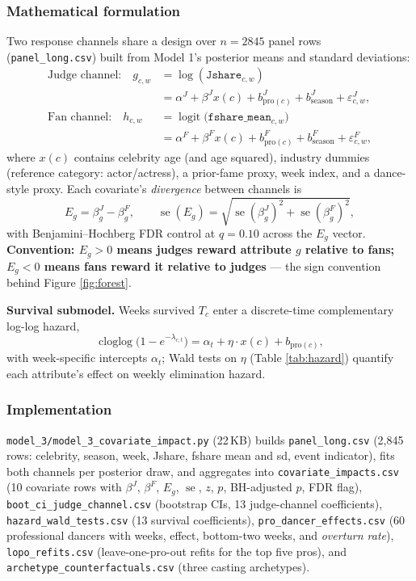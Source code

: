 \subsubsection{Mathematical formulation}

Two response channels share a design over $n = 2845$ panel rows
(\texttt{panel\_long.csv}) built from Model 1's posterior means and standard deviations:
\begin{align}
\text{Judge channel:}\quad g_{c,w} &= \log(\texttt{Jshare}_{c,w})\nonumber\\
 &= \alpha^J + \beta^J x(c) + b^J_{\text{pro}(c)} + b^J_{\text{season}} + \varepsilon^J_{c,w},\\
\text{Fan channel:}\quad h_{c,w} &= \operatorname{logit}\big(\texttt{fshare\_mean}_{c,w}\big)\nonumber\\
 &= \alpha^F + \beta^F x(c) + b^F_{\text{pro}(c)} + b^F_{\text{season}} + \varepsilon^F_{c,w},
\end{align}
where $x(c)$ contains celebrity age (and age squared), industry dummies (reference
category: actor/actress), a prior-fame proxy, week index, and a dance-style proxy.
Each covariate's \emph{divergence} between channels is
\begin{equation}
E_g = \beta^J_g - \beta^F_g, \qquad
\operatorname{se}(E_g) = \sqrt{\operatorname{se}(\beta^J_g)^2 + \operatorname{se}(\beta^F_g)^2},
\end{equation}
with Benjamini--Hochberg FDR control at $q = 0.10$ across the $E_g$ vector.
\textbf{Convention: $E_g > 0$ means judges reward attribute $g$ relative to fans;
$E_g < 0$ means fans reward it relative to judges} --- the sign convention behind
Figure \ref{fig:forest}.

\medskip
\noindent\textbf{Survival submodel.} Weeks survived $T_c$ enter a discrete-time
complementary log-log hazard,
\begin{equation}
\operatorname{cloglog}\big(1 - e^{-\lambda_{c,t}}\big) = \alpha_t + \eta\cdot x(c)
+ b_{\text{pro}(c)},
\end{equation}
with week-specific intercepts $\alpha_t$; Wald tests on $\eta$ (Table
\ref{tab:hazard}) quantify each attribute's effect on weekly elimination hazard.

\subsubsection{Implementation}

\texttt{model\_3/model\_3\_covariate\_impact.py} (22\,KB) builds
\texttt{panel\_long.csv} (2{,}845 rows: celebrity, season, week, Jshare, fshare mean and
sd, event indicator), fits both channels per posterior draw, and aggregates into
\texttt{covariate\_impacts.csv} (10 covariate rows with $\beta^J$, $\beta^F$, $E_g$,
$\operatorname{se}$, $z$, $p$, BH-adjusted $p$, FDR flag),
\texttt{boot\_ci\_judge\_channel.csv} (bootstrap CIs, 13 judge-channel coefficients),
\texttt{hazard\_wald\_tests.csv} (13 survival coefficients),
\texttt{pro\_dancer\_effects.csv} (60 professional dancers with weeks, effect,
bottom-two weeks, and \emph{overturn rate}), \texttt{lopo\_refits.csv}
(leave-one-pro-out refits for the top five pros), and
\texttt{archetype\_counterfactuals.csv} (three casting archetypes).

